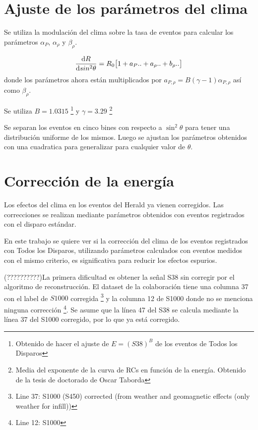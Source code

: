 \section{Ajuste de los parámetros del clima}

Se utiliza la modulación del clima sobre la tasa de eventos para calcular los parámetros $\alpha_P$, $\alpha_\rho$ y $\beta_\rho$.  

\begin{equation}
    \dv{R}{sin^2\theta} =  R_0 \big[ 1 + a_P.. + a_\rho ..+ b_\rho..  \big]
\end{equation}
donde los parámetros ahora están multiplicados por $a_{P,\rho} =B(\gamma -1)\alpha_{P,\rho}$ así como $\beta_{\rho}$. 

Se utiliza $B=1.0315$ \footnote{Obtenido de hacer el ajuste de $E=(S38)^B$ de los eventos de Todos los Disparos} y $\gamma=3.29$ \footnote{Media del exponente de la curva de RCs en función de la energía. Obtenido de la tesis de doctorado de Oscar Taborda}

Se separan los eventos en cinco bines con respecto a $\sin^2\theta$ para tener una distribución uniforme de los mismos. Luego se ajustan los parámetros obtenidos con una cuadratica para generalizar para cualquier valor de $\theta$.

\section{Corrección de la energía}

Los efectos del clima en los eventos del Herald ya vienen corregidos. Las correcciones se realizan mediante parámetros  obtenidos con eventos registrados con el disparo estándar. 

En este trabajo se quiere ver si la corrección del clima de los eventos registrados con Todos los Disparos, utilizando parámetros calculados con eventos medidos con el mismo criterio, es significativa para reducir los efectos espurios.

(??????????)La primera dificultad es obtener la señal S38 sin corregir por el algoritmo de reconstrucción. El dataset de la colaboración tiene una columna 37 con el label de $S1000$ corregida \footnote{Line 37: S1000 (S450) corrected (from weather and geomagnetic effects (only weather for infill))} y la columna 12 de S1000 donde no se menciona ninguna corrección \footnote{Line 12: S1000}. Se asume que la línea 47 del S38 se calcula mediante la línea 37 del S1000 corregido, por lo que ya está corregido.

